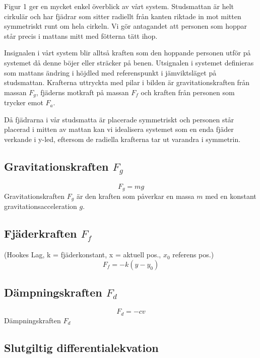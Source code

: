 \documentclass[10pt,a4paper]{article}
\begin{document}
Figur 1 ger en mycket enkel överblick av vårt system. Studsmattan är helt cirkulär och har fjädrar som sitter radiellt från kanten riktade in mot mitten symmetriskt runt om hela cirkeln. Vi gör antagandet att personen som hoppar står precis i mattans mitt med fötterna tätt ihop.


Insignalen i vårt system blir alltså kraften som den hoppande personen utför på systemet då denne böjer eller sträcker på benen. Utsignalen i systemet definieras som mattans ändring i höjdled med referenspunkt i jämviktsläget på studsmattan.
Krafterna uttryckta med pilar i bilden är gravitationskraften från massan $F_g$, fjäderns motkraft på massan $F_f$ och kraften från personen som trycker emot $F_a$.

Då fjädrarna i vår studsmatta är placerade symmetriskt och personen står placerad i mitten av mattan kan vi idealisera systemet som en enda fjäder verkande i y-led, eftersom de radiella krafterna tar ut varandra i symmetrin.

\subsection{Gravitationskraften $F_g$}

\begin{equation}
F_g = mg
\end{equation}
Gravitationskraften $F_g$ är den kraften som påverkar en massa $m$ med en konstant gravitationsacceleration $g$. 

\subsection{Fjäderkraften $F_f$}

(Hookes Lag, k = fjäderkonstant, x = aktuell pos., $x_0$ referens pos.)
\begin{equation}
F_f = -k(y - y_0)
\end{equation}

\subsection{Dämpningskraften $F_d$}
\begin{equation}
F_d = -cv
\end{equation}
Dämpningskraften $F_d$

\subsection{Slutgiltig differentialekvation}
\end{document}
